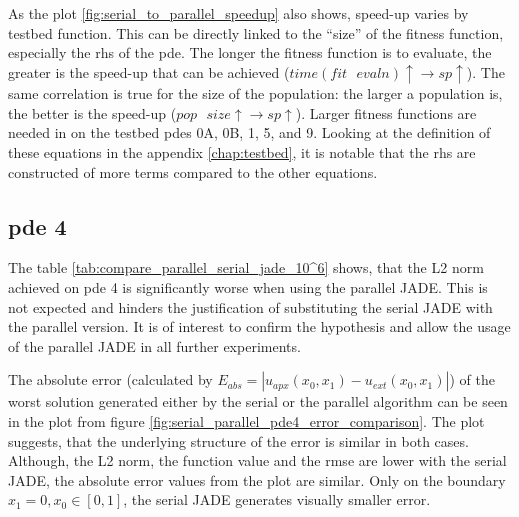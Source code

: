\documentclass[./\jobname.tex]{subfiles}
\begin{document}
As the plot \ref{fig:serial_to_parallel_speedup} also shows, speed-up varies by testbed function. This can be directly linked to the ``size'' of the fitness function, especially the \gls{rhs} of the \gls{pde}. The longer the fitness function is to evaluate, the greater is the speed-up that can be achieved ($time(fit \text{ } evaln) \uparrow \rightarrow sp \uparrow$). The same correlation is true for the size of the population: the larger a population is, the better is the speed-up ($pop \text{ } size \uparrow \rightarrow sp \uparrow$). Larger fitness functions are needed in on the testbed \gls{pde}s 0A, 0B, 1, 5, and 9. Looking at the definition of these equations in the appendix \ref{chap:testbed}, it is notable that the \gls{rhs} are constructed of more terms compared to the other equations. 

\subsection{\gls{pde} 4}

The table \ref{tab:compare_parallel_serial_jade_10^6} shows, that the L2 norm achieved on \gls{pde} 4 is significantly worse when using the parallel JADE. This is not expected and hinders the justification of substituting the serial JADE with the parallel version. It is of interest to confirm the hypothesis and allow the usage of the parallel JADE in all further experiments. 

The absolute error (calculated by $E_{abs} = \left| u_{apx}(x_0, x_1) - u_{ext}(x_0, x_1) \right|$) of the worst solution generated either by the serial or the parallel algorithm can be seen in the plot from figure \ref{fig:serial_parallel_pde4_error_comparison}. The plot suggests, that the underlying structure of the error is similar in both cases. Although, the L2 norm, the function value and the \gls{rmse} are lower with the serial JADE, the absolute error values from the plot are similar. Only on the boundary $x_1 = 0, x_0 \in [0,1]$, the serial JADE generates visually smaller error. 
\end{document}
